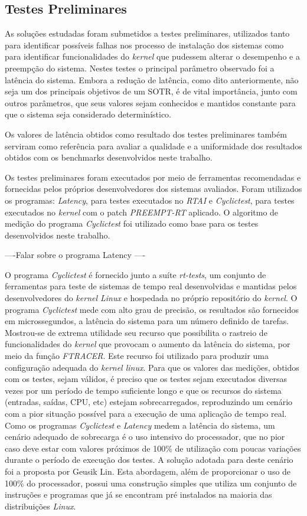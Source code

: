 \subsection{Testes Preliminares}
As soluções estudadas foram submetidos a testes preliminares, utilizados tanto para identificar possíveis falhas nos processo de instalação dos sistemas como para identificar funcionalidades do \textit{kernel} que pudessem alterar o desempenho e a preempção do sistema. Nestes testes o principal parâmetro observado foi a latência do sistema. Embora a redução de latência, como dito anteriormente, não seja um dos principais objetivos de um SOTR, é de vital importância, junto com outros parâmetros, que seus valores sejam conhecidos e mantidos constante para que o sistema seja considerado determinístico.

Os valores de latência obtidos como resultado dos testes preliminares também serviram como referência para avaliar a qualidade e a uniformidade dos resultados obtidos com os benchmarks desenvolvidos neste trabalho.

Os testes preliminares foram executados por meio de ferramentas recomendadas e fornecidas pelos próprios desenvolvedores dos sistemas avaliados. Foram utilizados os programas: \textit{Latency}, para testes executados no \textit{RTAI} e \textit{Cyclictest}, para testes executados no \textit{kernel} com o patch \textit{PREEMPT-RT} aplicado. O algoritmo de medição do programa \textit{Cyclictest} foi utilizado como base para os testes desenvolvidos neste trabalho.

----Falar sobre o programa Latency ----

O programa \textit{Cyclictest} é fornecido junto a suíte \textit{rt-tests}, um conjunto de ferramentas para teste de sistemas de tempo real desenvolvidas e mantidas pelos desenvolvedores do \textit{kernel Linux} e hospedada no próprio repositório do \textit{kernel}.
O programa \textit{Cyclictest} mede com alto grau de precisão, os resultados são fornecidos em microssegundos, a latência do sistema para um número definido de tarefas. Mostrou-se de extrema utilidade seu recurso que possibilita o rastreio de funcionalidades do \textit{kernel} que provocam o aumento da latência do sistema, por meio da função \textit{FTRACER}. Este recurso foi utilizado para produzir uma configuração adequada do \textit{kernel linux}.
Para que os valores das medições, obtidos com os testes, sejam válidos, é preciso que os testes sejam executados diversas vezes por um período de tempo suficiente longo e que os recursos do sistema (entradas, saídas, CPU, etc) estejam sobrecarregados, reproduzindo um cenário com a pior situação possível para a execução de uma aplicação de tempo real. Como os programas \textit{Cyclictest} e \textit{Latency} medem a latência do sistema, um cenário adequado de sobrecarga é o uso intensivo do processador, que no pior caso deve estar com valores próximos de 100\% de utilização  com poucas variações durante o período de execução dos testes.
A solução adotada para deste cenário foi a proposta por Geusik Lin. Esta abordagem, além de proporcionar o uso de 100\% do processador, possui uma construção simples que utiliza um conjunto de instruções e programas que já se encontram pré instalados na maioria das distribuições \textit{Linux}.

